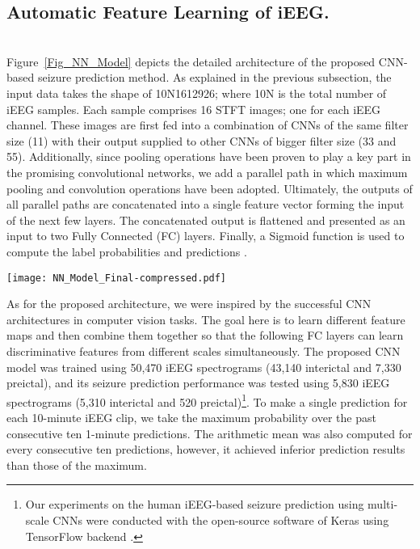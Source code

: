 \documentclass[journal]{IEEEtran}
\begin{document}
\subsection{Automatic Feature Learning of iEEG.} ~\\


Figure~\ref{Fig_NN_Model} depicts the detailed architecture of the proposed CNN-based seizure prediction method. As explained in the previous subsection, the input data takes the shape of 10N1612926; where 10N is the total number of iEEG samples. Each sample comprises 16 STFT images; one for each iEEG channel. These images are first fed into a combination of CNNs of the same filter size (11) with their output supplied to other CNNs of bigger filter size (33 and 55). Additionally, since pooling operations have been proven to play a key part in the promising convolutional networks, we add a parallel path in which maximum pooling and convolution operations have been adopted. Ultimately, the outputs of all parallel paths are concatenated into a single feature vector forming the input of the next few layers. The concatenated output is flattened and presented as an input to two Fully Connected (FC) layers. Finally, a Sigmoid function is used to compute the label probabilities and predictions \cite{Softmax}.

\begin{figure*}[!ht]
	\centering
	\texttt{[image: NN\_Model\_Final-compressed.pdf]}
	\caption{Schematic diagram of the proposed neural network architecture for epileptic seizure prediction: Each iEEG instance is of N12926 (N=16); Max Pooling stands for Maximum Pooling; FC layer stands for Fully Connected layer;  and  are the probabilities produced by the sigmoid function got class 1 and 2, respectively.}
	\label{Fig_NN_Model}
\end{figure*}

As for the proposed architecture, we were inspired by the successful CNN architectures in computer vision tasks. The goal here is to learn different feature maps and then combine them together so that the following FC layers can learn discriminative features from different scales simultaneously. The proposed CNN model was trained using 50,470 iEEG spectrograms (43,140 interictal and 7,330 preictal), and its seizure prediction performance was tested using 5,830 iEEG spectrograms (5,310 interictal and 520 preictal)\footnote[2]{Our experiments on the human iEEG-based seizure prediction using multi-scale CNNs were conducted with the open-source software of Keras using TensorFlow backend \cite{OurCodes}.}. To make a single prediction for each 10-minute iEEG clip, we take the maximum probability over the past consecutive ten 1-minute predictions. The arithmetic mean was also computed for every consecutive ten predictions, however, it achieved inferior prediction results than those of the maximum.    
\end{document}
